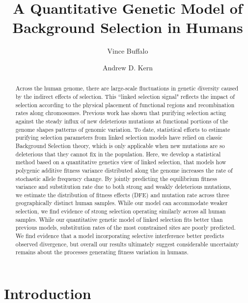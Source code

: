 \documentclass[11pt]{article}
\title{A Quantitative Genetic Model of Background Selection in Humans}
\author[1,2,$\dag$]{Vince Buffalo}
\author[2]{Andrew D. Kern}
\affil[1]{\small{Department of Integrative Biology, University of California, Berkeley}}
\affil[2]{\small{Institute of Ecology and Evolution and Department of Biology, University of Oregon }}
\affil[*]{Corresponding author email: \href{vsb@berkeley.edu}{vsb@berkeley.edu}}
\begin{document}
\maketitle

\linenumbers
\begin{abstract}
    Across the human genome, there are large-scale fluctuations in genetic diversity caused by the indirect effects of selection. 
    This ``linked selection signal" reflects the impact of selection according to the physical placement of functional regions and recombination
    rates along chromosomes. Previous work has shown that purifying selection
    acting against the steady influx of new deleterious mutations at functional portions
    of the genome shapes patterns of genomic variation. To date, statistical
    efforts to estimate purifying selection parameters from linked selection models have relied on
    classic Background Selection theory, which is only applicable when new mutations are so deleterious that they cannot fix in the population. 
    Here, we develop a statistical method based
    on a quantitative genetics view of linked selection, that models how
    polygenic additive fitness variance distributed along the genome increases 
    the rate of stochastic allele frequency change. By 
    jointly predicting the equilibrium fitness variance and substitution rate
    due to both strong and weakly deleterious mutations, we estimate the
    distribution of fitness effects (DFE) and mutation rate across three geographically distinct human samples. While our model can accommodate weaker selection, we find evidence of strong selection operating similarly across all human samples. While our quantitative genetic model of linked selection fits better than previous models, substitution rates of the most constrained sites are poorly predicted. We find evidence that a model incorporating selective interference better predicts observed divergence, but overall our results ultimately suggest considerable uncertainty remains about the processes generating fitness variation in humans.
\end{abstract}


\section*{Introduction}
\end{document}
